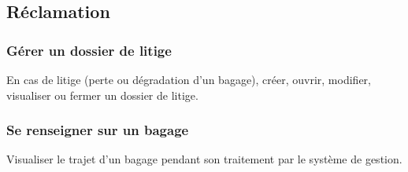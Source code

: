 \subsection{Réclamation}
\subsubsection{Gérer un dossier de litige}
En cas de litige (perte ou dégradation d'un bagage), créer, ouvrir, modifier, visualiser ou fermer un dossier de litige.

\subsubsection{Se renseigner sur un bagage}
Visualiser le trajet d'un bagage pendant son traitement par le système de gestion.
